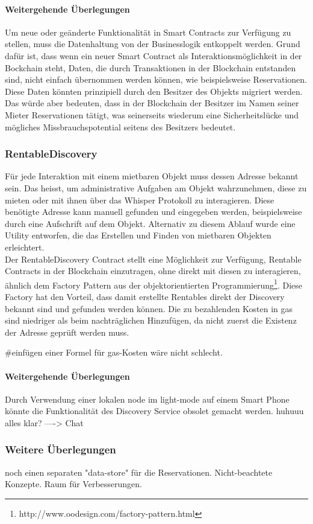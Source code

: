 \paragraph{Weitergehende Überlegungen}
Um neue oder geänderte Funktionalität in Smart Contracts zur Verfügung zu stellen, muss die Datenhaltung von der Businesslogik entkoppelt werden. Grund dafür ist, dass wenn ein neuer Smart Contract als Interaktionsmöglichkeit in der Bockchain steht, Daten, die durch Transaktionen in der Blockchain entstanden sind, nicht einfach übernommen werden können, wie beispielsweise Reservationen. Diese Daten könnten prinzipiell durch den Besitzer des Objekts migriert werden. Das würde aber bedeuten, dass in der Blockchain der Besitzer im Namen seiner Mieter Reservationen tätigt, was seinerseits wiederum eine Sicherheitslücke und mögliches Missbrauchspotential seitens des Besitzers bedeutet.

\subsubsection{RentableDiscovery}
Für jede Interaktion mit einem mietbaren Objekt muss dessen Adresse bekannt sein. Das heisst, um administrative Aufgaben am Objekt wahrzunehmen, diese zu mieten oder mit ihnen über das Whisper Protokoll zu interagieren. Diese benötigte Adresse kann manuell gefunden und eingegeben werden, beispielsweise durch eine Aufschrift auf dem Objekt. Alternativ zu diesem Ablauf wurde eine Utility entworfen, die das Erstellen und Finden von mietbaren Objekten erleichtert.
\\Der RentableDiscovery Contract stellt eine Möglichkeit zur Verfügung, Rentable Contracts in der Blockchain einzutragen, ohne direkt mit diesen zu interagieren, ähnlich dem Factory Pattern aus der objektorientierten Programmierung\footnote{http://www.oodesign.com/factory-pattern.html}. Diese Factory hat den Vorteil, dass damit erstellte Rentables direkt der Discovery bekannt sind und gefunden werden können. Die zu bezahlenden Kosten in gas sind niedriger als beim nachträglichen Hinzufügen, da nicht zuerst die Existenz der Adresse geprüft werden muss.

\#einfügen einer Formel für gas-Kosten wäre nicht schlecht.

\paragraph{Weitergehende Überlegungen}
Durch Verwendung einer lokalen node im light-mode auf einem Smart Phone könnte die Funktionalität des Discovery Service obsolet gemacht werden. huhuuu
alles klar?
----> Chat


\subsubsection{Weitere Überlegungen}
noch einen separaten "data-store" für die Reservationen. Nicht-beachtete Konzepte. Raum für Verbesserungen.



